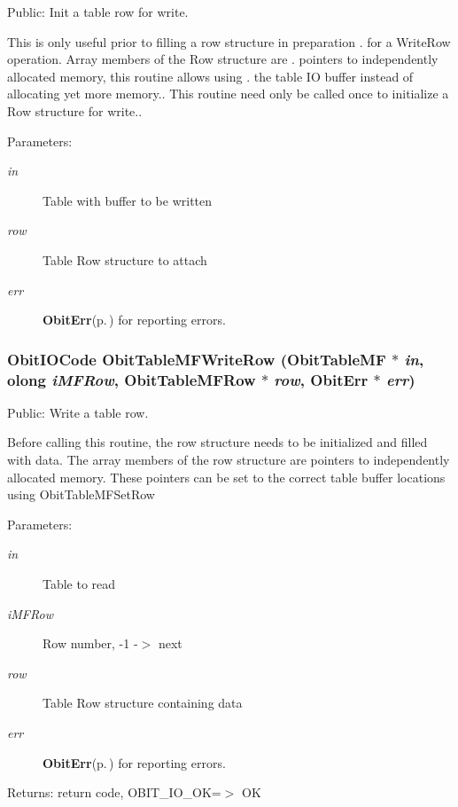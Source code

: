 Public: Init a table row for write. 

This is only useful prior to filling a row structure in preparation . for a Write\-Row operation. Array members of the Row structure are . pointers to independently allocated memory, this routine allows using . the table IO buffer instead of allocating yet more memory.. This routine need only be called once to initialize a Row structure for write.. \begin{Desc}
\item[Parameters:]
\begin{description}
\item[{\em in}]Table with buffer to be written \item[{\em row}]Table Row structure to attach \item[{\em err}]{\bf Obit\-Err}{\rm (p.\,\pageref{structObitErr})} for reporting errors. \end{description}
\end{Desc}
\subsubsection{\setlength{\rightskip}{0pt plus 5cm}Obit\-IOCode Obit\-Table\-MFWrite\-Row ({\bf Obit\-Table\-MF} $\ast$ {\em in}, {\bf olong} {\em i\-MFRow}, {\bf Obit\-Table\-MFRow} $\ast$ {\em row}, {\bf Obit\-Err} $\ast$ {\em err})}\label{ObitTableMF_8h_a20}


Public: Write a table row. 

Before calling this routine, the row structure needs to be initialized and filled with data. The array members of the row structure are pointers to independently allocated memory. These pointers can be set to the correct table buffer locations using Obit\-Table\-MFSet\-Row \begin{Desc}
\item[Parameters:]
\begin{description}
\item[{\em in}]Table to read \item[{\em i\-MFRow}]Row number, -1 -$>$ next \item[{\em row}]Table Row structure containing data \item[{\em err}]{\bf Obit\-Err}{\rm (p.\,\pageref{structObitErr})} for reporting errors. \end{description}
\end{Desc}
\begin{Desc}
\item[Returns:]return code, OBIT\_\-IO\_\-OK=$>$ OK \end{Desc}
